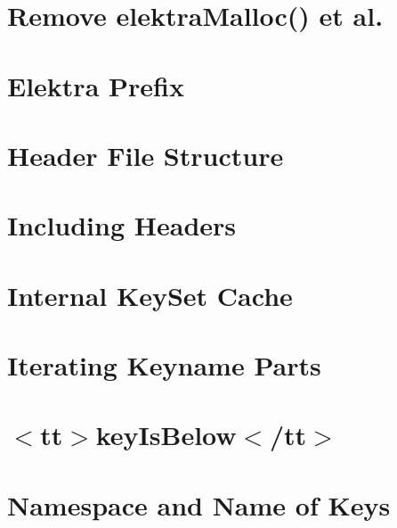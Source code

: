 \let\mypdfximage\pdfximage\def\pdfximage{\immediate\mypdfximage}\documentclass[twoside]{book}
\newcommand{\+}{\discretionary{\mbox{\scriptsize$\hookleftarrow$}}{}{}}
\begin{document}
\chapter{Remove elektra\+Malloc() et al.}
\label{doc_decisions_4_decided_elektra_malloc_md}

\chapter{Elektra Prefix}
\label{doc_decisions_4_decided_elektra_prefix_md}

\chapter{Header File Structure}
\label{doc_decisions_4_decided_header_file_structure_md}

\chapter{Including Headers}
\label{doc_decisions_4_decided_header_include_md}

\chapter{Internal Key\+Set Cache}
\label{doc_decisions_4_decided_internal_cache_md}

\chapter{Iterating Keyname Parts}
\label{doc_decisions_4_decided_iterating_name_parts_md}

\chapter{$<$tt$>$key\+Is\+Below$<$/tt$>$}
\label{doc_decisions_4_decided_key_below_md}

\chapter{Namespace and Name of Keys}
\label{doc_decisions_4_decided_keyname_md}

\end{document}
